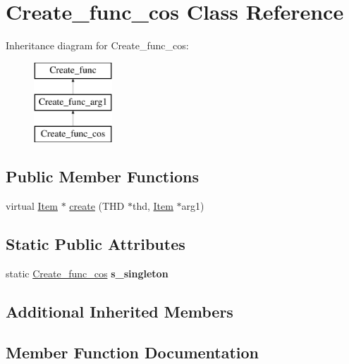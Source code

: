 \hypertarget{classCreate__func__cos}{}\section{Create\+\_\+func\+\_\+cos Class Reference}
\label{classCreate__func__cos}
Inheritance diagram for Create\+\_\+func\+\_\+cos\+:\begin{figure}[H]
\begin{center}
\leavevmode
\includegraphics[height=3.000000cm]{classCreate__func__cos}
\end{center}
\end{figure}
\subsection*{Public Member Functions}
\begin{DoxyCompactItemize}
\item 
virtual \mbox{\hyperlink{classItem}{Item}} $\ast$ \mbox{\hyperlink{classCreate__func__cos_a5430bffe3787fbce8ba1cc2e4628a48f}{create}} (T\+HD $\ast$thd, \mbox{\hyperlink{classItem}{Item}} $\ast$arg1)
\end{DoxyCompactItemize}
\subsection*{Static Public Attributes}
\begin{DoxyCompactItemize}
\item 
\mbox{\label{classCreate__func__cos_aa75a52e314470ecebcf86d3d75cd5771}} 
static \mbox{\hyperlink{classCreate__func__cos}{Create\+\_\+func\+\_\+cos}} {\bfseries s\+\_\+singleton}
\end{DoxyCompactItemize}
\subsection*{Additional Inherited Members}


\subsection{Member Function Documentation}
\mbox{\label{classCreate__func__cos_a5430bffe3787fbce8ba1cc2e4628a48f}} 
